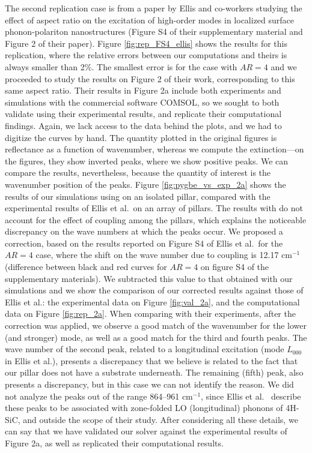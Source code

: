 The second replication case is from a paper by Ellis and co-workers \cite{ellis2016} studying the effect of aspect ratio on the excitation of high-order modes in localized surface phonon-polariton nanostructures (Figure S4 of their supplementary material and Figure 2 of their paper).
Figure \ref{fig:rep_FS4_ellis} shows the results for this replication, where the relative errors between our computations and theirs is always smaller than 2$\%$. The smallest error is for the case with $AR=4$ and we proceeded to study the results on Figure 2 of their work, corresponding to this same aspect ratio.
Their results in Figure 2a include both experiments and simulations with the commercial software COMSOL, so we sought to both validate \pygbe using their experimental results, and replicate their computational findings. 
Again, we lack access to the data behind the plots, and we had to digitize the curves by hand. 
The quantity plotted in the original figures is reflectance as a function of wavenumber, whereas we compute the extinction---on the figures, they show inverted peaks, where we show positive peaks.
We can compare the results, nevertheless, because the quantity of interest is the wavenumber position of the peaks.
Figure \ref{fig:pygbe_vs_exp_2a} shows the results of our simulations using \pygbe on an isolated pillar,
compared with the experimental results of Ellis et al.\ on an array of pillars.
The results with \pygbe  do not account for the effect of coupling among the pillars, which explains the noticeable discrepancy on the wave numbers at which the peaks occur. 
We proposed a correction, based on the results reported on Figure S4 of Ellis et al.\ for the $AR=4$ case, where the shift on the wave number due to coupling is 12.17 cm$^{-1}$ (difference between black and red curves for $AR=4$ on figure S4 of the supplementary materials). 
We subtracted this value to that obtained with our simulations and we show the comparison of our corrected results against those of Ellis et al.: the experimental data on Figure \ref{fig:val_2a}, and the
computational data on Figure \ref{fig:rep_2a}. 
When comparing with their experiments, after the correction was applied, we observe a good match of the wavenumber for the lower (and stronger) mode, as well as a good match for the 
third and fourth peaks. The wave number of the second peak, related to a longitudinal excitation (mode $L_{000}$ in Ellis et al.), presents a discrepancy that we believe is related to the fact that our 
pillar does not have a substrate underneath. The remaining (fifth) peak, also presents a discrepancy, but in this case we can not identify the reason.
We did not analyze the peaks out of the range 864--961 cm$^{-1}$, since Ellis et al. \ describe these peaks to be associated with zone-folded LO (longitudinal) phonons of 4H-SiC,
and outside the scope of their study.
After considering all these details, we can say that we have validated our solver \pygbe against the experimental results of Figure 2a, as well as replicated their computational results.

